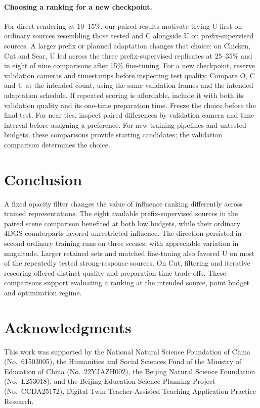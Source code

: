 \documentclass[pdflatex,sn-mathphys]{sn-jnl}
\makeatletter
\newcommand{\runinheading}[2]{\def\toclevel@paragraph{#1}\paragraph{#2}}
\makeatother
\begin{document}
\runinheading{2}{Choosing a ranking for a new checkpoint.}
For direct rendering at 10--15\%, our paired results motivate trying U first on ordinary sources resembling those tested and C alongside U on prefix-supervised sources. A larger prefix or planned adaptation changes that choice: on Chicken, Cut and Sear, U led across the three prefix-supervised replicates at 25--35\% and in eight of nine comparisons after 15\% fine-tuning. For a new checkpoint, reserve validation cameras and timestamps before inspecting test quality. Compare O, C and U at the intended count, using the same validation frames and the intended adaptation schedule. If repeated scoring is affordable, include it with both its validation quality and its one-time preparation time. Freeze the choice before the final test. For near ties, inspect paired differences by validation camera and time interval before assigning a preference. For new training pipelines and untested budgets, these comparisons provide starting candidates; the validation comparison determines the choice.

\section{Conclusion}\label{sec:conclusion}
A fixed opacity filter changes the value of influence ranking differently across trained representations. The eight available prefix-supervised sources in the paired scene comparison benefited at both low budgets, while their ordinary 4DGS counterparts favored unrestricted influence. The direction persisted in second ordinary training runs on three scenes, with appreciable variation in magnitude. Larger retained sets and matched fine-tuning also favored U on most of the repeatedly tested strong-response sources. On Cut, filtering and iterative rescoring offered distinct quality and preparation-time trade-offs. These comparisons support evaluating a ranking at the intended source, point budget and optimization regime.

\section*{Acknowledgments}
This work was supported by the National Natural Science Foundation of China (No.~61503005), the Humanities and Social Sciences Fund of the Ministry of Education of China (No.~22YJAZH002), the Beijing Natural Science Foundation (No.~L253018), and the Beijing Education Science Planning Project (No.~CCDA25172), Digital Twin Teacher-Assisted Teaching Application Practice Research.
\end{document}
